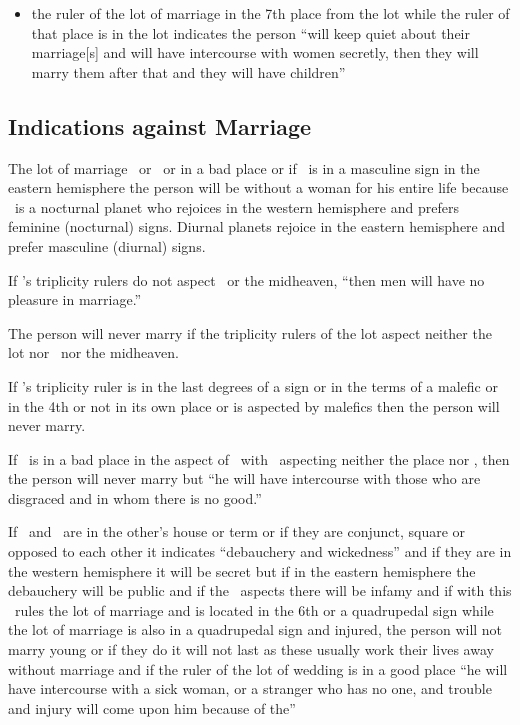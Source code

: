 \begin{itemize}
\item the ruler of the lot of marriage in the 7th place from the lot while the ruler of that place is in the lot indicates the person ``will keep quiet about their marriage[s] and will have intercourse with women secretly, then they will marry them after that and they will have children''
\end{itemize}

\subsection{Indications against Marriage}

The lot of marriage \Opposition\Venus\, or \Opposition\ASC\, or in a bad place or if \Venus\, is in a masculine sign in the eastern hemisphere the person will be without a woman for his entire life because \Venus\, is a nocturnal planet who rejoices in the western hemisphere and prefers feminine (nocturnal) signs. Diurnal planets rejoice in the eastern hemisphere and prefer masculine (diurnal) signs.

If \Venus's triplicity rulers do not aspect \Venus\, or the midheaven, ``then men will have no pleasure in marriage.''

The person will never marry if the triplicity rulers of the lot aspect neither the lot nor \Venus\, nor the midheaven.

If \Venus's triplicity ruler is in the last degrees of a sign or in the terms of a malefic or in the 4th or not in its own place or is aspected by malefics then the person will never marry.

If \Venus\, is in a bad place in the aspect of \Saturn\, with \Jupiter\, aspecting neither the place nor \Saturn, then the person will never marry but ``he will have intercourse with those who are disgraced and in whom there is no good.''

If \Venus\, and \Mars\, are in the other's house or term or if they are  conjunct, square or opposed to each other it indicates ``debauchery and wickedness'' and if they are in the western hemisphere it will be secret but if in the eastern hemisphere the debauchery will be public and if the \Sun\, aspects there will be infamy and if with this \Mercury\, rules the lot of marriage and is located in the 6th or a quadrupedal sign while the lot of marriage is also in a quadrupedal sign and injured, the person will not marry young or if they do it will not last as these usually work their lives away without marriage and if the ruler of the lot of wedding is in a good place ``he will have intercourse with a sick woman, or a stranger who has no one, and trouble and injury will come upon him because of the''

